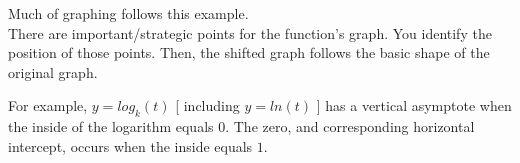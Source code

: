 \documentclass{ximera}
\begin{document}
\begin{example}
\begin{image}
\end{image}








\end{example}


Much of graphing follows this example.  \\


There are important/strategic points for the function's graph. You identify the position of those points.  Then, the shifted graph follows the basic shape of the original graph.






For example, $y = log_k(t)$ [ including $y = ln(t)$ ] has a vertical asymptote when the inside of the logarithm equals $0$. The zero, and corresponding horizontal intercept, occurs when the inside equals $1$.  
\end{document}
